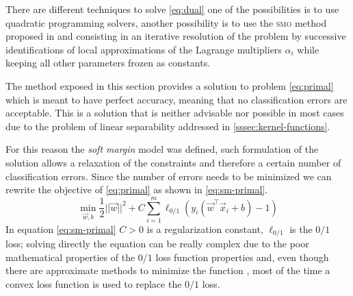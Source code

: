 There are different techniques to solve \cref{eq:dual} one of the possibilities is to use quadratic
programming solvers, another possibility is to use the \textsc{smo} method proposed in
\cite{platt1998} and consisting in an iterative resolution of the problem by successive
identifications of local approximations of the Lagrange multipliers $\alpha_i$ while keeping all
other parameters frozen as constants.

\medskip

The method exposed in this section provides a solution to problem \cref{eq:primal} which is meant to
have perfect accuracy, meaning that no classification errors are acceptable. This is a solution that
is neither advisable nor possible in most cases due to the problem of linear separability addressed
in \cref{sssec:kernel-functions}.

For this reason the \emph{soft margin} \svm model was defined, such formulation of the solution
allows a relaxation of the constraints and therefore a certain number of classification errors.
Since the number of errors needs to be minimized we can rewrite the objective of \cref{eq:primal} as
shown in \cref{eq:sm-primal}.
\begin{equation}
	\label{eq:sm-primal}
	\min_{\vec{w}, b} \frac{1}{2}||\vec{w}||^2 + C\sum_{i = 1}^m \ell_{0 / 1}(y_i (\vec{w}^\top \vec{x}_i + b) - 1)
\end{equation}
In equation \cref{eq:sm-primal} $C > 0$ is a regularization constant, $\ell_{0 / 1}$ is the $0/1$
loss; solving directly the equation can be really complex due to the poor mathematical properties of
the $0/1$ loss function properties and, even though there are approximate methods to minimize the
function \cite{nguyen2013}, most of the time a convex loss function is used to replace the $0/1$
loss.

